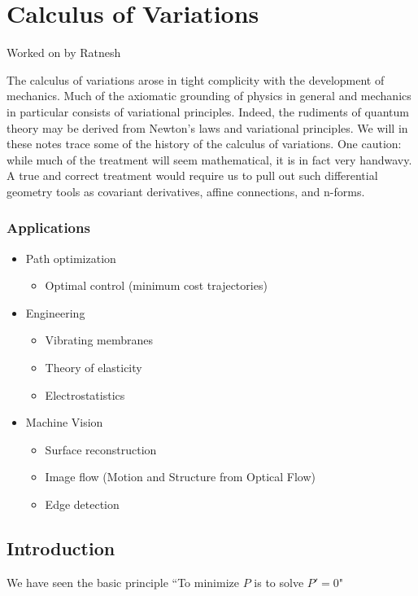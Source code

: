 \chapter{Calculus of Variations}
Worked on by Ratnesh

The calculus of variations arose in tight complicity with the development of mechanics. 
Much of the axiomatic grounding of physics in general and mechanics in particular consists of variational principles. 
Indeed, the rudiments of quantum theory may be derived from Newton's laws and variational principles. 
We will in these notes trace some of the history of the calculus of variations. 
One caution: while much of the treatment will seem mathematical, it is in fact very handwavy. 
A true and correct treatment would require us to pull out such differential geometry tools as covariant derivatives, affine connections, and n-forms. 

\subsection*{Applications}
\begin{itemize}
    \item Path optimization
       \begin{itemize}
            \item Optimal control (minimum cost trajectories)
        \end{itemize}
    \item Engineering
        \begin{itemize}
            \item Vibrating membranes
            \item Theory of elasticity
            \item Electrostatistics
        \end{itemize}
    \item Machine Vision
        \begin{itemize}
            \item Surface reconstruction
            \item Image flow (Motion and Structure from Optical Flow)
            \item Edge detection
        \end{itemize}    
\end{itemize}

\section{Introduction}
We have seen the basic principle ``To minimize $P$ is to solve $P' = 0$"

